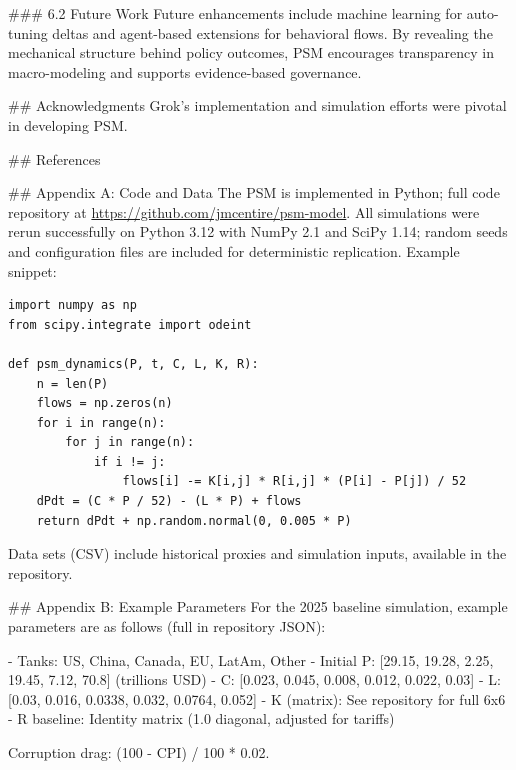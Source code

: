 \documentclass[11pt]{article}
\begin{document}
### 6.2 Future Work
Future enhancements include machine learning for auto-tuning deltas and agent-based extensions for behavioral flows. By revealing the mechanical structure behind policy outcomes, PSM encourages transparency in macro-modeling and supports evidence-based governance.

## Acknowledgments
Grok's implementation and simulation efforts were pivotal in developing PSM.

## References


## Appendix A: Code and Data
The PSM is implemented in Python; full code repository at \url{https://github.com/jmcentire/psm-model}. All simulations were rerun successfully on Python 3.12 with NumPy 2.1 and SciPy 1.14; random seeds and configuration files are included for deterministic replication. Example snippet:

\begin{verbatim}
import numpy as np
from scipy.integrate import odeint

def psm_dynamics(P, t, C, L, K, R):
    n = len(P)
    flows = np.zeros(n)
    for i in range(n):
        for j in range(n):
            if i != j:
                flows[i] -= K[i,j] * R[i,j] * (P[i] - P[j]) / 52
    dPdt = (C * P / 52) - (L * P) + flows
    return dPdt + np.random.normal(0, 0.005 * P)
\end{verbatim}

Data sets (CSV) include historical proxies and simulation inputs, available in the repository. 

## Appendix B: Example Parameters
For the 2025 baseline simulation, example parameters are as follows (full in repository JSON):

- Tanks: US, China, Canada, EU, LatAm, Other
- Initial P: [29.15, 19.28, 2.25, 19.45, 7.12, 70.8] (trillions USD)
- C: [0.023, 0.045, 0.008, 0.012, 0.022, 0.03]
- L: [0.03, 0.016, 0.0338, 0.032, 0.0764, 0.052]
- K (matrix): See repository for full 6x6
- R baseline: Identity matrix (1.0 diagonal, adjusted for tariffs)

Corruption drag: (100 - CPI) / 100 * 0.02.
\end{document}
